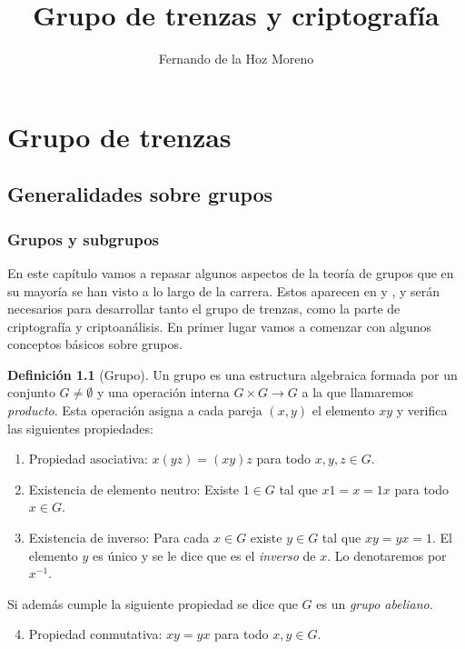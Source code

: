 \documentclass[12pt]{book}
\title{Grupo de trenzas y criptografía}
\author{Fernando de la Hoz Moreno}
\date{}
\theoremstyle{definition}
\newtheorem{defi}{Definición}[section]
\begin{document}
\maketitle
\newpage
\tableofcontents
\newpage
\part{Grupo de trenzas}
\chapter{Generalidades sobre grupos}
\section{Grupos y subgrupos}
\label{sec:grupos}
En este capítulo vamos a repasar algunos aspectos de la teoría de grupos que en su mayoría se han visto a lo largo de la carrera. Estos aparecen en \cite{group} y \cite{br_gr}, y serán necesarios para desarrollar tanto el grupo de trenzas, como la parte de criptografía y criptoanálisis. En primer lugar vamos a comenzar con algunos conceptos básicos sobre grupos.

\begin{defi}[Grupo]
Un grupo es una estructura algebraica formada por un conjunto $G\neq\emptyset$ y una operación interna $G\times G\rightarrow G$ a la que llamaremos \textit{producto}. Esta operación asigna a cada pareja $(x,y)$ el elemento $xy$ y verifica las siguientes propiedades:

\begin{enumerate}
\item Propiedad asociativa: $x(yz) = (xy)z$ para todo $x,y,z\in G$.
\item Existencia de elemento neutro: Existe $1\in G$ tal que $x1= x = 1x$ para todo $ x\in G$.
\item Existencia de inverso: Para cada $x \in G$ existe $y\in G$ tal que $xy=yx = 1$. El elemento $y$ es único y se le dice que es el \textit{inverso} de $x$. Lo denotaremos por $x^{-1}$.
\end{enumerate}
Si además cumple la siguiente propiedad se dice que $G$ es un \textit{grupo abeliano}.
\begin{enumerate}
\setcounter{enumi}{3}
\item Propiedad conmutativa: $xy=yx$ para todo $x,y\in G$.
\end{enumerate}
\end{defi}
\end{document}
